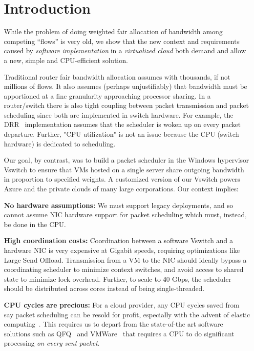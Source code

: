\section {Introduction}

While the problem of doing weighted fair allocation of
bandwidth among competing ``flows'' is very old, we show
that the new context and requirements caused by {\em software 
implementation} in a {\em virtualized cloud} both demand 
and allow a new, simple and CPU-efficient solution. 

Traditional router fair bandwidth allocation assumes
with thousands, if not millions of flows. It also assumes (perhaps
unjustifiably) that bandwidth must be apportioned at a fine granularity approaching processor 
sharing.  In a router/switch there is also tight coupling between packet transmission and 
packet scheduling since both are implemented in switch hardware.  For example, the
DRR~\cite{drr} implementation assumes that the scheduler is woken up on every
packet departure. Further, "CPU utilization"  is not an issue because
the CPU (switch hardware) is dedicated to scheduling.

Our goal, by contrast, was to build a packet scheduler in the Windows
hypervisor Vswitch to ensure that VMs hosted on a single server share outgoing
bandwidth in proportion to specified weights.  A customized version of our Vswitch powers Azure and 
the private clouds of many large corporations. Our context implies:

{\bf No hardware assumptions:} We must support legacy deployments, and so cannot assume NIC hardware support for
packet scheduling which must, instead, be done in the CPU.

{\bf High coordination costs:} Coordination between a
software Vswitch and a hardware NIC is very expensive at Gigabit speeds, requiring optimizations
like Large Send Offload.  Transmission from a VM to the NIC
should ideally bypass a coordinating scheduler to
minimize context switches, and avoid access to shared state to minimize lock
overhead.  Further, to scale to 40 Gbps, the scheduler should be distributed
across cores instead of being single-threaded. 

{\bf CPU cycles are precious:} For a cloud provider, any
CPU cycles saved from say packet scheduling can
be resold for profit, especially with the advent of elastic
computing~\cite{aws}.  This requires us to depart from the state-of-the art software
solutions such as QFQ~\cite{qfq} and VMWare~\cite{} that requires a CPU
to do significant processing {\em on every sent packet}.

